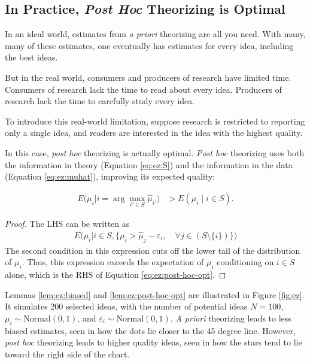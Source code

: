 \documentclass[12pt,english]{article}
\theoremstyle{plain}
\theoremstyle{plain}
\begin{document}
\subsection{In Practice, \emph{Post Hoc} Theorizing is Optimal}\label{sec:ez:practical}

In an ideal world, estimates from \emph{a priori} theorizing are all you need. With many, many of these estimates, one  eventually has estimates for every idea, including the best ideas.

But in the real world, consumers and producers of research have limited time. Consumers of research lack the time to read about every idea. Producers of research lack the time to carefully study every idea.

To introduce this real-world limitation, suppose research is restricted to reporting only a single idea, and readers are interested in the idea with the highest quality.

In this case, \emph{post hoc} theorizing is actually optimal. \emph{Post hoc} theorizing uses both the information in theory (Equation \eqref{eq:ez:S}) and the information in the data (Equation \eqref{eq:ez:muhat}), improving its expected quality:
\begin{lemma}\label{lem:ez:post-hoc-opt}
    \begin{align}
        E\bigg(\mu_{i}\big|i=\arg\max_{i'\in S }\hat{\mu}_{i'}\bigg) & >E\left(\mu_{i}\mid i\in S \right).
        \label{eq:ez:post-hoc-opt}
    \end{align}            
\end{lemma} 
\begin{proof}
    The LHS can be written as 
    \begin{align*}
        E\bigg(\mu_i
        \big|
        i \in S,
        \{
         \mu_i 
        > \hat{\mu}_j - \varepsilon_i
        , \quad
         \forall j \in \left( S\setminus\{i\}
         \right)
         \}
         \bigg)
    \end{align*}
The second condition in this expression cuts off the lower tail of the distribution of $\mu_i$. Thus, this expression exceeds the expectation of $\mu_i$ conditioning on $i\in S$ alone, which is the RHS of Equation \eqref{eq:ez:post-hoc-opt}.
\end{proof}

Lemmas \ref{lem:ez:biased} and \ref{lem:ez:post-hoc-opt} are illustrated in Figure \ref{fig:ez}. It simulates 200 selected ideas, with the number of potential ideas $N=100$, $\mu_i \sim \text{Normal}\left(0, 1\right)$, and $\varepsilon_i \sim \text{Normal}\left(0, 1\right)$. \emph{A priori} theorizing leads to less biased estimates, seen in how the dots lie closer to the 45 degree line. However, \emph{post hoc} theorizing leads to higher quality ideas, seen  in how the stars tend to lie toward the right side of the chart.
\end{document}
